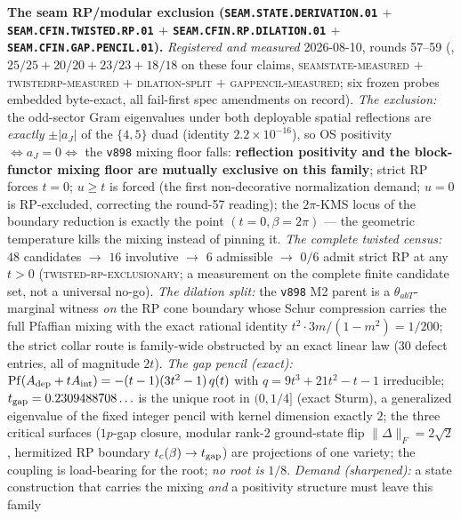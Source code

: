 \documentclass[11pt,a4paper]{article}
\begin{document}
\par\smallskip\noindent\textbf{The seam RP/modular exclusion
(\texttt{SEAM.STATE.\allowbreak DERIVATION.01} $+$
\texttt{SEAM.CFIN.TWISTED.\allowbreak RP.01} $+$
\texttt{SEAM.CFIN.RP.\allowbreak DILATION.01} $+$
\texttt{SEAM.CFIN.GAP.\allowbreak PENCIL.01}).}
{\sloppy
\emph{Registered and measured} 2026-08-10, rounds 57--59
(, $25/25 + 20/20 + 23/23 +
18/18$ on these four claims, \textsc{seamstate-measured} $+$
\textsc{twistedrp-measured} $+$ \textsc{dilation-split} $+$
\textsc{gappencil-measured}; six frozen probes embedded
byte-exact, all fail-first spec amendments on record).
\emph{The exclusion:} the odd-sector Gram eigenvalues under both
deployable spatial reflections are \emph{exactly} $\pm|a_J|$ of
the $\{4,5\}$ duad (identity $2.2\times10^{-16}$), so OS
positivity $\iff a_J = 0 \iff$ the \texttt{v898} mixing floor
falls: \textbf{reflection positivity and the block-functor mixing
floor are mutually exclusive on this family}; strict RP forces
$t = 0$; $u \ge t$ is forced (the first non-decorative
normalization demand; $u = 0$ is RP-excluded, correcting the
round-57 reading); the $2\pi$-KMS locus of the boundary reduction
is exactly the point $(t{=}0, \beta{=}2\pi)$ --- the geometric
temperature kills the mixing instead of pinning it.  \emph{The
complete twisted census:} $48$ candidates $\to$ $16$ involutive
$\to$ $6$ admissible $\to$ $0/6$ admit strict RP at any $t > 0$
(\textsc{twisted-rp-exclusionary}; a measurement on the complete
finite candidate set, not a universal no-go).  \emph{The dilation
split:} the \texttt{v898} M2 parent is a $\theta_{abT}$-marginal
witness \emph{on} the RP cone boundary whose Schur compression
carries the full Pfaffian mixing with the exact rational identity
$t^2 \cdot 3m/(1-m^2) = 1/200$; the strict collar route is
family-wide obstructed by an exact linear law ($30$ defect
entries, all of magnitude $2t$).  \emph{The gap pencil (exact):}
$\operatorname{Pf}(A_{\rm dep} + t A_{\rm int}) =
-(t-1)(3t^2-1)\,q(t)$ with $q = 9t^3 + 21t^2 - t - 1$
irreducible; $t_{\rm gap} = 0.2309488708\ldots$ is the unique
root in $(0, 1/4]$ (exact Sturm), a generalized eigenvalue of the
fixed integer pencil with kernel dimension exactly $2$; the three
critical surfaces ($1p$-gap closure, modular rank-2 ground-state
flip $\|\Delta\|_F = 2\sqrt2$, hermitized RP boundary
$t_c(\beta) \to t_{\rm gap}$) are projections of one variety; the
coupling is load-bearing for the root; \emph{no root is} $1/8$.
\emph{Demand (sharpened):} a state construction that carries the
mixing \emph{and} a positivity structure must leave this family
}
\end{document}
